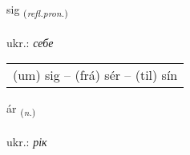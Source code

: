 \documentclass[frontgrid, backgrid]{flacards}\usepackage[]{graphicx}\usepackage[]{xcolor}
\begin{document}
\renewcommand{\flhead}{\vskip5pt \fboxsep=0pt {\small\bfseries\footnotesize Fornafn | займенник}}
\renewcommand{\fcfoot}{\vskip5pt \fboxsep=0pt \hspace{2pt}{\small\bfseries\footnotesize 1K}}

\renewcommand{\blhead}{\vskip5pt {\small\bfseries\footnotesize Fornafn | займенник }}
\renewcommand{\bcfoot}{\vskip5pt \hspace{2pt}{\small\bfseries\footnotesize 1K}}


{sig \small{\textsubscript{(\textit{refl.pron.})}} \\[1ex] %
\textphonetic{[sɪːɣ]} \\
ukr.: \emph{себе} \\  [2ex]
\renewcommand*{\arraystretch}{0.8}
\begin{tabular}{l}
(um) sig -- (frá) sér -- (til) sín \\ 
\end{tabular}
}

\renewcommand{\flhead}{\vskip5pt \fboxsep=0pt {\small\bfseries\footnotesize Nafnorð | іменник}}
\renewcommand{\fcfoot}{\vskip5pt \fboxsep=0pt \hspace{2pt}{\small\bfseries\footnotesize 1K}}

\renewcommand{\blhead}{\vskip5pt {\small\bfseries\footnotesize Nafnorð | іменник }}
\renewcommand{\bcfoot}{\vskip5pt \hspace{2pt}{\small\bfseries\footnotesize 1K}}


{ár \small{\textsubscript{(\textit{n.})}} \\[1ex] %
\textphonetic{[auːr]} \\
ukr.: \emph{рік} \\  [2ex]
\renewcommand*{\arraystretch}{0.8}
}
\end{document}
